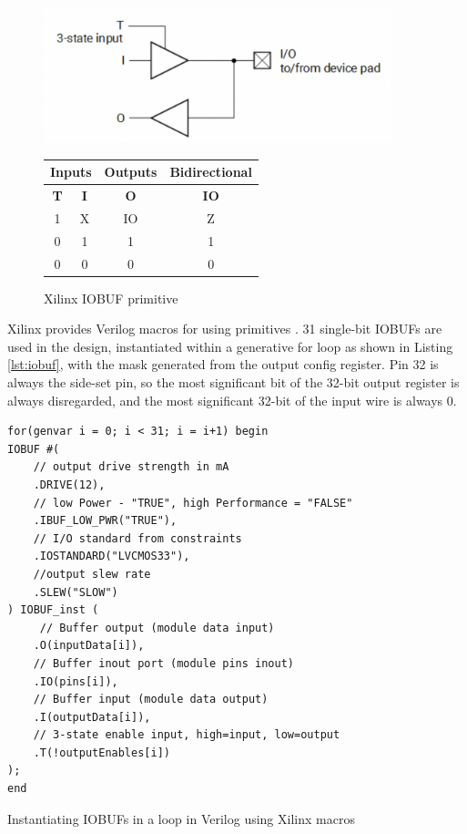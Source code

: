 \begin{figure}[H]
    \centering
    \includegraphics[width=0.9\textwidth]{../img/iobuf.png}
    \begin{tabular}{|c|c|c|c|}
        \hline
        \multicolumn{2}{|c|}{\textbf{Inputs}} & \textbf{Outputs} & \textbf{Bidirectional}               \\\hline
        \textbf{T}                            & \textbf{I}       & \textbf{O}             & \textbf{IO} \\\hline
        1                                     & X                & IO                     & Z           \\\hline
        0                                     & 1                & 1                      & 1           \\\hline
        0                                     & 0                & 0                      & 0           \\\hline
    \end{tabular}
    \caption{Xilinx IOBUF primitive \cite{vivado_libs}}
    \label{fig:iobuf}
\end{figure}

Xilinx provides Verilog macros for using primitives \cite{vivado_libs}. 31 single-bit IOBUFs are used in the design, instantiated within a generative for loop as shown in Listing \ref{lst:iobuf}, with the  mask generated from the output config register. Pin 32 is always the side-set pin, so the most significant bit of the 32-bit output register is always disregarded, and the most significant 32-bit of the input wire is always 0.

\begin{listing}[h!]
    \vspace{0.5cm}
    \begin{verbatim}
for(genvar i = 0; i < 31; i = i+1) begin
IOBUF #( 
    // output drive strength in mA
    .DRIVE(12), 
    // low Power - "TRUE", high Performance = "FALSE"
    .IBUF_LOW_PWR("TRUE"),  
    // I/O standard from constraints
    .IOSTANDARD("LVCMOS33"),
    //output slew rate 
    .SLEW("SLOW") 
) IOBUF_inst (
     // Buffer output (module data input)
    .O(inputData[i]),
    // Buffer inout port (module pins inout)     
    .IO(pins[i]),   
    // Buffer input (module data output)
    .I(outputData[i]),     
    // 3-state enable input, high=input, low=output
    .T(!outputEnables[i])     
);
end
    \end{verbatim}
    \caption{Instantiating IOBUFs in a loop in Verilog using Xilinx macros\cite{vivado_libs}}
    \label{lst:iobuf}
\end{listing}

